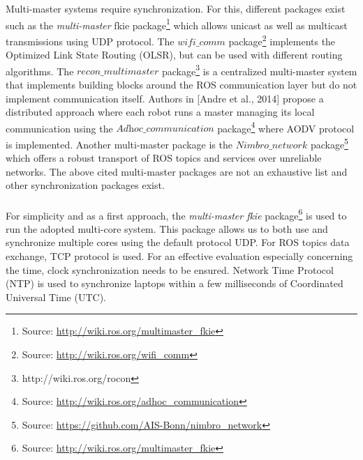 \documentclass[11pt,openany]{book}
\begin{document}
Multi-master systems require synchronization. For this, diﬀerent packages exist such as the \textit{multi-master} fkie package\footnote{Source: \url{http://wiki.ros.org/multimaster_fkie}} which allows unicast as well as multicast transmissions using UDP protocol. The $\textit{wifi\_comm}$ package\footnote{Source: \url{http://wiki.ros.org/wifi_comm}} implements the Optimized Link State Routing (OLSR), but can be used with diﬀerent routing algorithms. The $\textit{recon\_multimaster}$ package\footnote{http://wiki.ros.org/rocon} is a centralized multi-master system that implements building blocks around the ROS communication layer but do not implement communication itself. Authors in [Andre et al., 2014] propose a distributed approach where each robot runs a master managing its local communication using the $\textit{Adhoc\_communication}$ package\footnote{Source: \url{http://wiki.ros.org/adhoc_communication}} where AODV protocol is implemented. Another multi-master package is the $\textit{Nimbro\_network}$ package\footnote{Source: \url{https://github.com/AIS-Bonn/nimbro_network}} which oﬀers a robust transport of ROS topics and services over unreliable networks. The above cited multi-master packages are not an exhaustive list and other synchronization packages exist.\\\\
For simplicity and as a ﬁrst approach, the \textit{multi-master fkie} package\footnote{Source: \url{http://wiki.ros.org/multimaster_fkie}} is used to run the adopted multi-core system. This package allows us to both use and synchronize multiple cores using the default protocol UDP. For ROS topics data exchange, TCP protocol is used. For an eﬀective evaluation especially concerning the time, clock synchronization needs to be ensured. Network Time Protocol (NTP) is used to synchronize laptops within a few milliseconds of Coordinated Universal Time (UTC).
\end{document}

